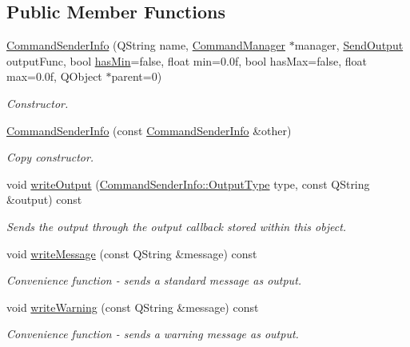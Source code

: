 \subsection*{Public Member Functions}
\begin{DoxyCompactItemize}
\item 
\hyperlink{class_command_sender_info_a2e699544abc14568046168b014f4f16e}{Command\-Sender\-Info} (Q\-String name, \hyperlink{class_command_manager}{Command\-Manager} $\ast$manager, \hyperlink{class_command_sender_info_a68c494ef69a25ac7bf667b83e24639ed}{Send\-Output} output\-Func, bool \hyperlink{class_command_sender_info_a9f34e6eb3bab0b16dff37fdacd82695e}{has\-Min}=false, float min=0.\-0f, bool has\-Max=false, float max=0.\-0f, Q\-Object $\ast$parent=0)
\begin{DoxyCompactList}\small\item\em Constructor. \end{DoxyCompactList}\item 
\hyperlink{class_command_sender_info_ae52b21dd10b8c15fa87c6bdbb6f9ed8c}{Command\-Sender\-Info} (const \hyperlink{class_command_sender_info}{Command\-Sender\-Info} \&other)
\begin{DoxyCompactList}\small\item\em Copy constructor. \end{DoxyCompactList}\item 
void \hyperlink{class_command_sender_info_a405f18d255eb60211b373bf58c287d05}{write\-Output} (\hyperlink{class_command_sender_info_a3a5e6a2ef1772f6557f351652c2e3b60}{Command\-Sender\-Info\-::\-Output\-Type} type, const Q\-String \&output) const 
\begin{DoxyCompactList}\small\item\em Sends the output through the output callback stored within this object. \end{DoxyCompactList}\item 
void \hyperlink{class_command_sender_info_a0d081d74145ea6a83502acee2d995e50}{write\-Message} (const Q\-String \&message) const 
\begin{DoxyCompactList}\small\item\em Convenience function -\/ sends a standard message as output. \end{DoxyCompactList}\item 
void \hyperlink{class_command_sender_info_a7c679e9584183f503e322e4149c28dde}{write\-Warning} (const Q\-String \&message) const 
\begin{DoxyCompactList}\small\item\em Convenience function -\/ sends a warning message as output. \end{DoxyCompactList}\item 

\end{DoxyCompactItemize}
